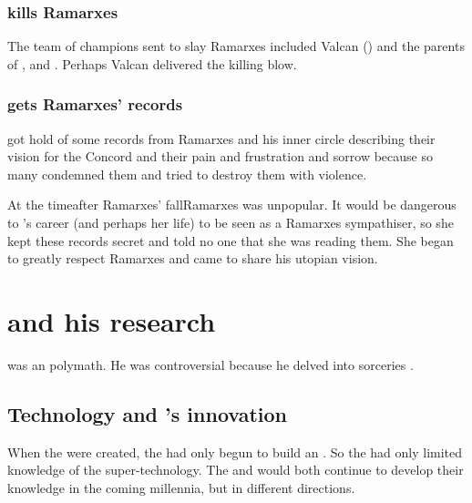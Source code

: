 \subsubsection{\Sethicus kills Ramarxes}
The team of champions sent to slay Ramarxes included Valcan () and the parents of \Nexagglachel, \Iscrafel and \Secherdamon. 
Perhaps Valcan delivered the killing blow. 





\subsubsection[Tyrasshana gets Ramarxes' records]{\Tiamat gets Ramarxes' records}
\Tiamat got hold of some records from Ramarxes and his inner circle describing their vision for the Concord and their pain and frustration and sorrow because so many condemned them and tried to destroy them with violence.

At the time\dash after Ramarxes' fall\dash Ramarxes was unpopular.
It would be dangerous to \Tiamat's career (and perhaps her life) to be seen as a Ramarxes sympathiser, so she kept these records secret and told no one that she was reading them. 
She began to greatly respect Ramarxes and came to share his utopian vision. 

























\section{\Sethicus and his research}
\Sethicus was an \ophidian polymath.
He was controversial because he delved into sorceries . 







\subsection{Technology and \Sethicus's innovation}
When the \dragons were created, the \ophidians had only begun to build an . 
So the \dragons had only limited knowledge of the \ophidian super-technology.
The \dragons and \ophidians would both continue to develop their knowledge in the coming millennia, but in different directions. 

